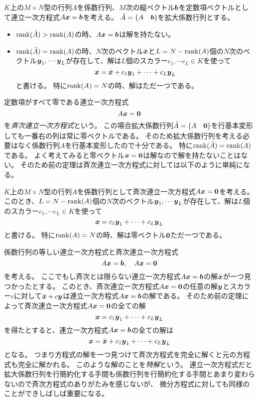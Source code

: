 \begin{theorem}[連立一次方程式の解]
$K$上の$M\times N$型の行列$A$を係数行列、$M$次の縦ベクトル$\vb*{b}$を定数項ベクトルとして連立一次方程式$A\vb*{x} = \vb*{b}$を考える。
$\tilde{A} = \begin{pmatrix}A & \vb*{b}\end{pmatrix}$を拡大係数行列とする。
\begin{itemize}
\item
$\rank(\tilde{A}) > \rank(A)$の時、$A\vb*{x} = \vb*{b}$は解を持たない。
\item
$\rank(\tilde{A}) = \rank(A)$の時、$N$次のベクトル$\bar{\vb*{x}}$と$L = N-\rank(A)$個の$N$次のベクトル$\vb*{y}_1, \cdots \vb*{y}_L$が存在して、解は$L$個のスカラー$c_1, \cdots c_L \in K$を使って
$$
\vb*{x} = \bar{\vb*{x}}+c_1\vb*{y}_1+\cdots+c_L\vb*{y}_L
$$
と書ける。
特に$\rank(A) = N$の時、解はただ一つである。
\end{itemize}
\end{theorem}

定数項がすべて零である連立一次方程式
$$
A\vb*{x} = \vb*{0}
$$
を\emph{斉次連立一次方程式}という。
この場合拡大係数行列$\tilde{A} = \begin{pmatrix}A & \vb*{0}\end{pmatrix}$を行基本変形しても一番右の列は常に零ベクトルである。
そのため拡大係数行列を考える必要はなく係数行列$A$を行基本変形したので十分である。
特に$\rank(\tilde{A}) = \rank(A)$である。
よく考えてみると零ベクトル$\vb*{x} = \vb*{0}$は解なので解を持たないことはない。
そのため前の定理は斉次連立一次方程式に対しては以下のように単純になる。

\begin{theorem}[斉次連立一次方程式の解]
\label{t:homlinsys}
$K$上の$M\times N$型の行列$A$を係数行列として斉次連立一次方程式$A\vb*{x} = \vb*{0}$を考える。
このとき、$L = N-\rank(A)$個の$N$次のベクトル$\vb*{y}_1, \cdots \vb*{y}_L$が存在して、解は$L$個のスカラー$c_1, \cdots c_L \in K$を使って
$$
\vb*{x} = c_1\vb*{y}_1+\cdots+c_L\vb*{y}_L
$$
と書ける。
特に$\rank(A) = N$の時、解は零ベクトル$\vb*{0}$ただ一つである。
\end{theorem}

係数行列の等しい連立一次方程式と斉次連立一次方程式
$$
A\vb*{x} = \vb*{b},
\quad A\vb*{x} = \vb*{0}
$$
を考える。
ここでもし斉次とは限らない連立一次方程式$A\vb*{x} = \vb*{b}$の解$\bar{\vb*{x}}$が一つ見つかったとする。
このとき、斉次連立一次方程式$A\vb*{x} = \vb*{0}$の任意の解$\vb*{y}$とスカラー$c$に対して$\bar{\vb*{x}}+c\vb*{y}$は連立一次方程式$A\vb*{x} = \vb*{b}$の解である。
そのため前の定理によって斉次連立一次方程式$A\vb*{x} = \vb*{0}$の全ての解
$$
\vb*{x} = c_1\vb*{y}_1+\cdots+c_L\vb*{y}_L
$$
を得たとすると、連立一次方程式$A\vb*{x} = \vb*{b}$の全ての解は
$$
\vb*{x} = \bar{\vb*{x}}+c_1\vb*{y}_1+\cdots+c_L\vb*{y}_L
$$
となる。
つまり方程式の解を一つ見つけて斉次方程式を完全に解くと元の方程式も完全に解かれる。
このような解のことを\emph{特解}という。
連立一次方程式だと拡大係数行列を行簡約化する手間も係数行列を行簡約化する手間とあまり変わらないので斉次方程式のありがたみを感じないが、
微分方程式に対しても同様のことができしばしば重要になる。

